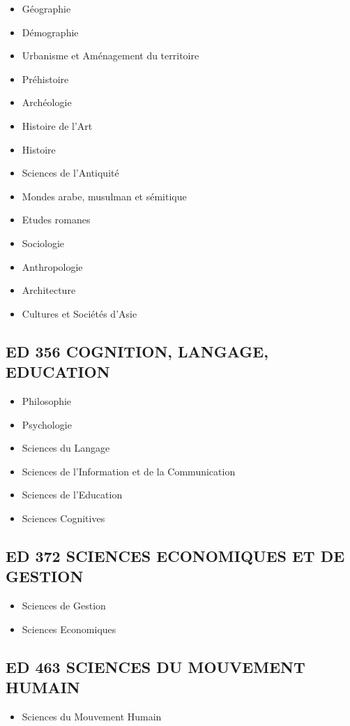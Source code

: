 		\begin{itemize}
		\item Géographie
		\item Démographie
		\item Urbanisme et Aménagement du territoire
		\item Préhistoire
		\item Archéologie
		\item Histoire de l'Art
		\item Histoire
		\item Sciences de l'Antiquité
		\item Mondes arabe, musulman et sémitique
		\item Etudes romanes
		\item Sociologie
		\item Anthropologie
		\item Architecture
		\item Cultures et Sociétés d'Asie
		\end{itemize}

	\subsection*{ED 356 COGNITION, LANGAGE, EDUCATION}\label{ed-356-cognition-langage-education}

		\begin{itemize}
		\item Philosophie
		\item Psychologie
		\item Sciences du Langage
		\item Sciences de l'Information et de la Communication
		\item Sciences de l'Education
		\item Sciences Cognitives
		\end{itemize}

	\subsection*{ED 372 SCIENCES ECONOMIQUES ET DE GESTION}\label{ed-372-sciences-economiques-et-de-gestion}

		\begin{itemize}
		\item Sciences de Gestion
		\item Sciences Economiques
		\end{itemize}

	\subsection*{ED 463 SCIENCES DU MOUVEMENT HUMAIN}\label{ed-463-sciences-du-mouvement-humain}

		\begin{itemize}
		\item Sciences du Mouvement Humain 
		\end{itemize}
